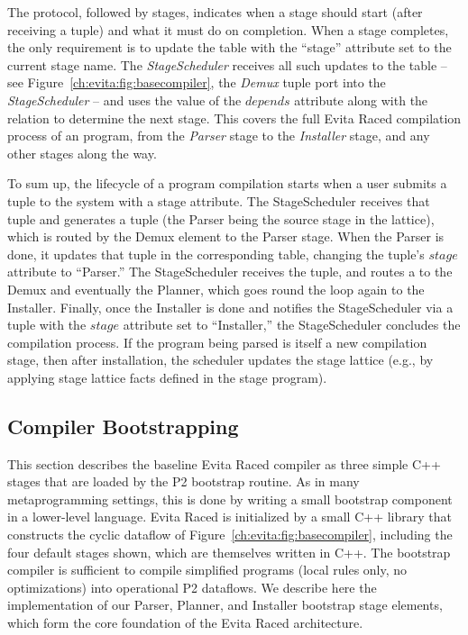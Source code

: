 The protocol, followed by stages, indicates when a stage should start (after
receiving a  tuple) and what it must do on
completion.  When a stage completes, the only requirement is to update the
 table with the ``stage'' attribute set to the current stage name.  The
{\em StageScheduler} receives all such updates to the  table -- see
Figure~\ref{ch:evita:fig:basecompiler}, the {\em Demux}  tuple port
into the {\em StageScheduler} -- and uses the value of the 
$depends$ attribute along with the  relation to determine the
next stage.  This covers the full Evita Raced compilation process of an
\OVERLOG program, from the {\em Parser} stage to the {\em Installer} stage, and
any other stages along the way.

To sum up, the lifecycle of a program compilation starts when a user submits a
 tuple to the system with a  stage attribute.  The
StageScheduler receives that  tuple and generates a
 tuple (the Parser being the source stage in the
lattice), which is routed by the Demux element to the Parser stage.  When the
Parser is done, it updates that  tuple in the corresponding table,
changing the tuple's $stage$ attribute to ``Parser.'' The StageScheduler
receives the  tuple, and routes a  to the
Demux and eventually the Planner, which goes round the loop again to
the Installer.  Finally, once the Installer is done and notifies the
StageScheduler via a  tuple with the $stage$ attribute set to
``Installer,'' the StageScheduler concludes the compilation process.  If the
\OVERLOG program being parsed is itself a new compilation stage, then after
installation, the scheduler updates the stage lattice (e.g., by applying 
stage lattice facts defined in the stage program).


\subsection{Compiler Bootstrapping}
\label{ch:evita:sec:bootstrap}

This section describes the baseline Evita Raced compiler as three simple C++
stages that are loaded by the P2 bootstrap routine.  As in many metaprogramming
settings, this is done by writing a small bootstrap component in a lower-level
language.  Evita Raced is initialized by a small C++ library that constructs
the cyclic dataflow of Figure~\ref{ch:evita:fig:basecompiler}, including the
four default stages shown, which are themselves written in C++.  The bootstrap
compiler is sufficient to compile simplified \OVERLOG programs (local rules
only, no optimizations) into operational P2 dataflows.  We describe here the
implementation of our Parser, Planner, and Installer bootstrap stage elements,
which form the core foundation of the Evita Raced architecture.

